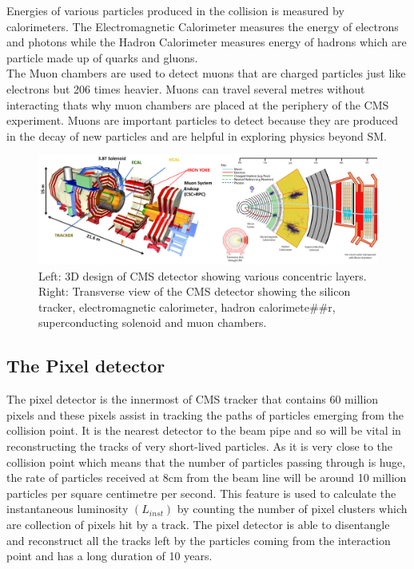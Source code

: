 Energies of various particles produced in the collision is measured by calorimeters. The Electromagnetic Calorimeter measures the energy of electrons and photons while the Hadron Calorimeter measures energy of hadrons which are particle made up of quarks and gluons. \\

The Muon chambers are used to detect muons that are charged particles just like electrons but 206 times heavier. Muons can travel several metres without interacting thats why muon chambers are placed at the periphery of the CMS experiment. Muons are important particles to detect because they are produced in the decay of new particles and are helpful in exploring physics beyond SM.



\begin{figure}[H]
  \centering
  \includegraphics[width=1\columnwidth]{./cmsdetector_merged.png}
  \caption{Left: 3D design of CMS detector showing various concentric layers. Right: \onehalfspacing Transverse view of the CMS detector showing the silicon tracker, electromagnetic calorimeter, hadron calorimete##r, superconducting solenoid and muon chambers. \cite{Chatrchyan:2008aa}}
  \label{fig:CMSdetector}
\end{figure}





\subsection{The Pixel detector}

The pixel detector is the innermost of CMS tracker that contains 60 million pixels and these pixels assist in tracking the paths of particles emerging from the collision point. It is the nearest detector to the beam pipe and so will be vital in reconstructing the tracks of very short-lived particles. As it is very close to the collision point which means that the number of particles passing through is huge, the rate of particles received at 8cm from the beam line will be around 10 million particles per square centimetre per second. This feature is used to calculate the instantaneous luminosity $(L_{inst})$ by counting the number of pixel clusters which are collection of pixels hit by a track. The pixel detector is able to disentangle and reconstruct all the tracks left by the particles coming from the interaction point and has a long duration of 10 years. \\

